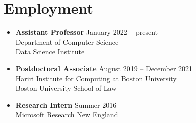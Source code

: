 
\newcommand{\cvjob}[3]%
  {\item \textbf{#1} \hfill #3 \\ #2}




\section{Employment}

\begin{itemize}[label={}]
\cvjob%
{Assistant Professor}%
{Department of Computer Science \\ Data Science Institute}%
{January 2022 -- present}%

\cvjob%
{Postdoctoral Associate}%
{Hariri Institute for Computing at Boston University \\ Boston University School of Law}%
{August 2019 -- December 2021}%

\cvjob%
{Research Intern}%
{Microsoft Research New England}%
{Summer 2016}%

%

\end{itemize}
